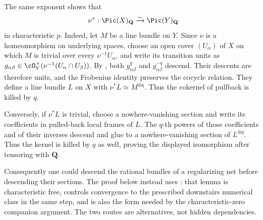 \begin{remark}
\label{rem:ch43-picard-frobenius}
The same exponent shows that
\[
 \nu^*:\Pic(X)_{\mathbf Q}\xrightarrow{\sim}\Pic(Y)_{\mathbf Q}
\]
in characteristic $p$.  Indeed, let $M$ be a line bundle on $Y$.  Since
$\nu$ is a homeomorphism on underlying spaces, choose an open cover
$(U_\alpha)$ of $X$ on which $M$ is trivial over every
$\nu^{-1}U_\alpha$, and write its transition units as
$g_{\alpha\beta}\in
\cO_Y^\times(\nu^{-1}(U_\alpha\cap U_\beta))$.  By
, both $g_{\alpha\beta}^q$ and
$g_{\alpha\beta}^{-q}$ descend.  Their descents are therefore units, and
the Frobenius identity preserves the cocycle relation.  They define a line
bundle $L$ on $X$ with $\nu^*L\simeq M^{\otimes q}$.  Thus the cokernel of
pullback is killed by $q$.

Conversely, if $\nu^*L$ is trivial, choose a nowhere-vanishing section and
write its coefficients in pulled-back local frames of $L$.  The $q$-th
powers of those coefficients and of their inverses descend and glue to a
nowhere-vanishing section of $L^{\otimes q}$.  Thus the kernel is killed by
$q$ as well, proving the displayed isomorphism after tensoring with
$\mathbf Q$.

Consequently one could descend the rational bundles of a regularizing net
before descending their sections.  The proof below instead uses
: that lemma is characteristic
free, controls convergence to the prescribed downstairs numerical class in
the same step, and is also the form needed by the characteristic-zero
companion argument.  The two routes are alternatives, not hidden
dependencies.
\end{remark}

